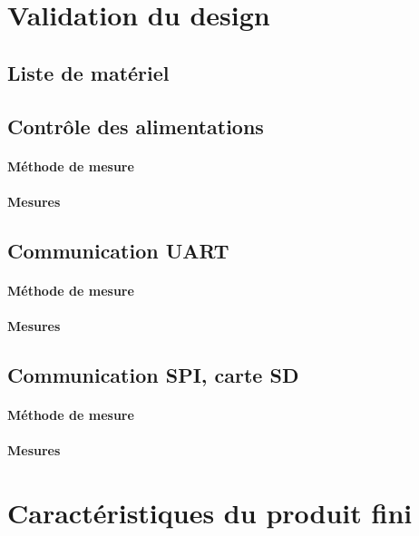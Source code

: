 \section{Validation du design} \label{sec:Validation-design}

\subsection{Liste de matériel} \label{ssec:Liste-materiel}

\subsection{Contrôle des alimentations} \label{ssec:Controle-alims}
\paragraph{Méthode de mesure}
\paragraph{Mesures}

\subsection{Communication UART} \label{ssec:Comm-UART}
\paragraph{Méthode de mesure}
\paragraph{Mesures}

\subsection{Communication SPI, carte SD} \label{ssec:Comm-SPI}
\paragraph{Méthode de mesure}
\paragraph{Mesures}

\section{Caractéristiques du produit fini} \label{sec:Carac-finis}